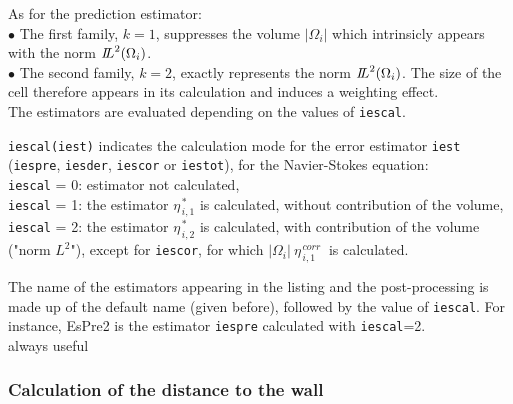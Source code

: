 As for the prediction estimator:\\
\hspace*{0.5cm}$\bullet$ The first family, $k=1$, suppresses the
volume $|\Omega_i|$ which intrinsicly appears  with the norm
${{I\hspace{-.25em}L}^{2}(\Omega_i)}$.\\
\hspace*{0.5cm}$\bullet$ The second family, $k=2$, exactly represents the norm
${{I\hspace{-.25em}L}^{2}(\Omega_i)}$. The size of the cell therefore
appears in its calculation and induces a weighting effect.\\


The estimators are evaluated depending on the values of {\tt iescal}.


{{\tt iescal(iest)} indicates the calculation mode
for the error estimator {\tt iest} ({\tt iespre}, {\tt iesder}, {\tt iescor} or
{\tt iestot}), for
the Navier-Stokes equation:\\
 {\tt iescal} = 0: estimator not calculated, \\
 {\tt iescal} = 1: the estimator $ \eta^{\,* }_{\,i,1}$ is calculated,
                   without contribution of the volume, \\
 {\tt iescal} = 2: the estimator $ \eta^{\,* }_{\,i,2}$ is calculated,
                   with contribution of the volume ("norm $L^2$"),
                   except for {\tt iescor}, for which
                   $|\Omega_i|\ \eta^{\,corr}_{\,i,1}\ $
                   is calculated.

The name of the estimators appearing in the listing and the post-processing is
made up of the default name (given before), followed by the value of
{\tt iescal}. For
instance, EsPre2 is the estimator {\tt iespre} calculated with {\tt iescal}=2.\\
always useful}


\subsubsection{Calculation of the distance to the wall}

